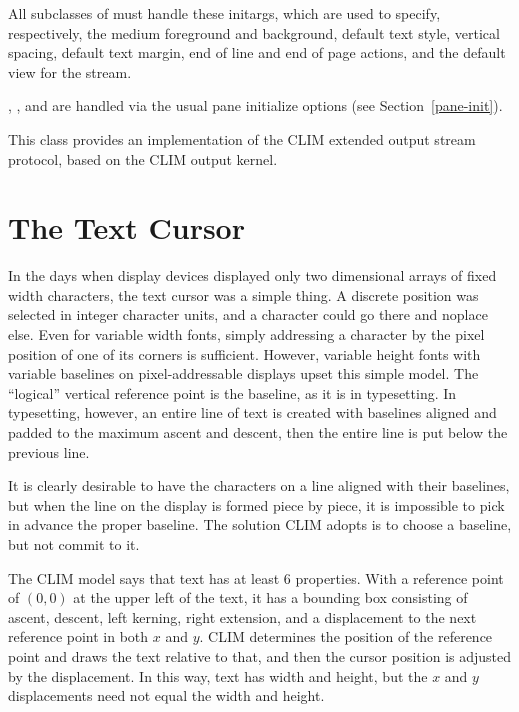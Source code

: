 
All subclasses of  must handle these initargs, which
are used to specify, respectively, the medium foreground and background, default
text style, vertical spacing, default text margin, end of line and end of page
actions, and the default view for the stream.

, , and  are handled via the
usual pane initialize options (see Section~\ref{pane-init}).


This class provides an implementation of the CLIM extended output stream
protocol, based on the CLIM output kernel.

\Mutable


\section {The Text Cursor}

In the days when display devices displayed only two dimensional arrays of fixed
width characters, the text cursor was a simple thing.  A discrete position was
selected in integer character units, and a character could go there and noplace
else.  Even for variable width fonts, simply addressing a character by the pixel
position of one of its corners is sufficient.  However, variable height fonts
with variable baselines on pixel-addressable displays upset this simple model.
The ``logical'' vertical reference point is the baseline, as it is in
typesetting.  In typesetting, however, an entire line of text is created with
baselines aligned and padded to the maximum ascent and descent, then the entire
line is put below the previous line.  

It is clearly desirable to have the characters on a line aligned with their
baselines, but when the line on the display is formed piece by piece, it is
impossible to pick in advance the proper baseline.  The solution CLIM adopts is
to choose a baseline, but not commit to it.

The CLIM model says that text has at least 6 properties.  With a reference point
of $(0,0)$ at the upper left of the text, it has a bounding box consisting of
ascent, descent, left kerning, right extension, and a displacement to the next
reference point in both $x$ and $y$.  CLIM determines the position of the
reference point and draws the text relative to that, and then the cursor
position is adjusted by the displacement.  In this way, text has width and
height, but the $x$ and $y$ displacements need not equal the width and height.

